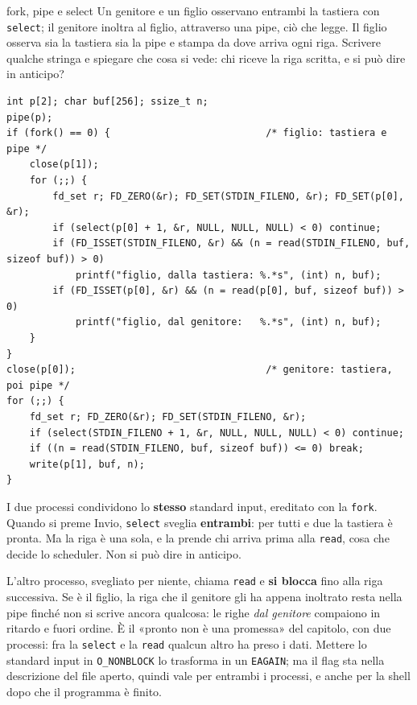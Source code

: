 \begin{esercizio}{fork, pipe e select}
Un genitore e un figlio osservano entrambi la tastiera con \texttt{select}; il genitore inoltra al figlio, attraverso una
pipe, ciò che legge. Il figlio osserva sia la tastiera sia la pipe e stampa da dove arriva ogni riga. Scrivere qualche
stringa e spiegare che cosa si vede: chi riceve la riga scritta, e si può dire in anticipo?

\svolgimento
\begin{lstlisting}[language={[POSIX]C}, style=wnumbers, title={fork\_pipe\_select.c}]
int p[2]; char buf[256]; ssize_t n;
pipe(p);
if (fork() == 0) {                           /* figlio: tastiera e pipe */
    close(p[1]);
    for (;;) {
        fd_set r; FD_ZERO(&r); FD_SET(STDIN_FILENO, &r); FD_SET(p[0], &r);
        if (select(p[0] + 1, &r, NULL, NULL, NULL) < 0) continue;
        if (FD_ISSET(STDIN_FILENO, &r) && (n = read(STDIN_FILENO, buf, sizeof buf)) > 0)
            printf("figlio, dalla tastiera: %.*s", (int) n, buf);
        if (FD_ISSET(p[0], &r) && (n = read(p[0], buf, sizeof buf)) > 0)
            printf("figlio, dal genitore:   %.*s", (int) n, buf);
    }
}
close(p[0]);                                 /* genitore: tastiera, poi pipe */
for (;;) {
    fd_set r; FD_ZERO(&r); FD_SET(STDIN_FILENO, &r);
    if (select(STDIN_FILENO + 1, &r, NULL, NULL, NULL) < 0) continue;
    if ((n = read(STDIN_FILENO, buf, sizeof buf)) <= 0) break;
    write(p[1], buf, n);
}
\end{lstlisting}

I due processi condividono lo \textbf{stesso} standard input, ereditato con la \texttt{fork}. Quando si preme Invio,
\texttt{select} sveglia \textbf{entrambi}: per tutti e due la tastiera è pronta. Ma la riga è una sola, e la prende chi
arriva prima alla \texttt{read}, cosa che decide lo scheduler. Non si può dire in anticipo.

L'altro processo, svegliato per niente, chiama \texttt{read} e \textbf{si blocca} fino alla riga successiva. Se è il
figlio, la riga che il genitore gli ha appena inoltrato resta nella pipe finché non si scrive ancora qualcosa: le righe
\emph{dal genitore} compaiono in ritardo e fuori ordine. È il «pronto non è una promessa» del capitolo, con due processi:
fra la \texttt{select} e la \texttt{read} qualcun altro ha preso i dati. Mettere lo standard input in
\texttt{O\_NONBLOCK} lo trasforma in un \texttt{EAGAIN}; ma il flag sta nella descrizione del file aperto, quindi vale per
entrambi i processi, e anche per la shell dopo che il programma è finito.
\end{esercizio}

